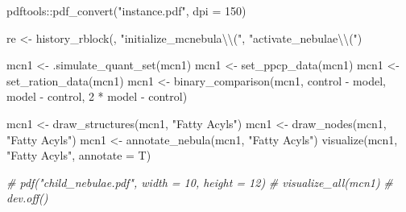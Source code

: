 \documentclass[
]{article}
\newenvironment{Shaded}{\begin{snugshade}}{\end{snugshade}}
\newcommand{\AttributeTok}[1]{\textcolor[rgb]{0.77,0.63,0.00}{#1}}
\newcommand{\CommentTok}[1]{\textcolor[rgb]{0.56,0.35,0.01}{\textit{#1}}}
\newcommand{\DecValTok}[1]{\textcolor[rgb]{0.00,0.00,0.81}{#1}}
\newcommand{\FunctionTok}[1]{\textcolor[rgb]{0.00,0.00,0.00}{#1}}
\newcommand{\NormalTok}[1]{#1}
\newcommand{\OtherTok}[1]{\textcolor[rgb]{0.56,0.35,0.01}{#1}}
\newcommand{\SpecialCharTok}[1]{\textcolor[rgb]{0.00,0.00,0.00}{#1}}
\newcommand{\StringTok}[1]{\textcolor[rgb]{0.31,0.60,0.02}{#1}}
\begin{document}
\begin{Shaded}
\begin{Highlighting}[]
\NormalTok{pdftools}\SpecialCharTok{::}\FunctionTok{pdf\_convert}\NormalTok{(}\StringTok{"instance.pdf"}\NormalTok{, }\AttributeTok{dpi =} \DecValTok{150}\NormalTok{)}

\NormalTok{re }\OtherTok{\textless{}{-}} \FunctionTok{history\_rblock}\NormalTok{(, }\StringTok{"initialize\_mcnebula}\SpecialCharTok{\textbackslash{}\textbackslash{}}\StringTok{("}\NormalTok{, }\StringTok{"activate\_nebulae}\SpecialCharTok{\textbackslash{}\textbackslash{}}\StringTok{("}\NormalTok{)}

\NormalTok{mcn1 }\OtherTok{\textless{}{-}} \FunctionTok{.simulate\_quant\_set}\NormalTok{(mcn1)}
\NormalTok{mcn1 }\OtherTok{\textless{}{-}} \FunctionTok{set\_ppcp\_data}\NormalTok{(mcn1)}
\NormalTok{mcn1 }\OtherTok{\textless{}{-}} \FunctionTok{set\_ration\_data}\NormalTok{(mcn1)}
\NormalTok{mcn1 }\OtherTok{\textless{}{-}} \FunctionTok{binary\_comparison}\NormalTok{(mcn1, control }\SpecialCharTok{{-}}\NormalTok{ model,}
\NormalTok{                           model }\SpecialCharTok{{-}}\NormalTok{ control, }\DecValTok{2} \SpecialCharTok{*}\NormalTok{ model }\SpecialCharTok{{-}}\NormalTok{ control)}

\NormalTok{mcn1 }\OtherTok{\textless{}{-}} \FunctionTok{draw\_structures}\NormalTok{(mcn1, }\StringTok{"Fatty Acyls"}\NormalTok{)}
\NormalTok{mcn1 }\OtherTok{\textless{}{-}} \FunctionTok{draw\_nodes}\NormalTok{(mcn1, }\StringTok{"Fatty Acyls"}\NormalTok{)}
\NormalTok{mcn1 }\OtherTok{\textless{}{-}} \FunctionTok{annotate\_nebula}\NormalTok{(mcn1, }\StringTok{"Fatty Acyls"}\NormalTok{)}
\FunctionTok{visualize}\NormalTok{(mcn1, }\StringTok{"Fatty Acyls"}\NormalTok{, }\AttributeTok{annotate =}\NormalTok{ T)}

\CommentTok{\# pdf("child\_nebulae.pdf", width = 10, height = 12)}
\CommentTok{\# visualize\_all(mcn1)}
\CommentTok{\# dev.off()}


\end{Highlighting}
\end{Shaded}
\end{document}

